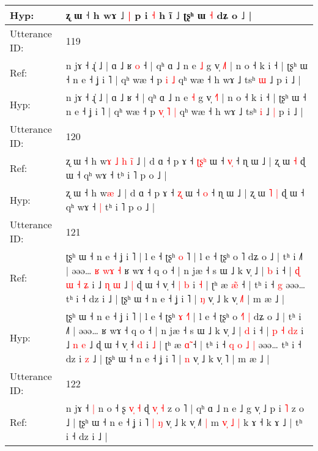 \documentclass[10pt]{article}
\DeclareRobustCommand{\hl}[1]{{\textcolor{red}{#1}}}
\begin{document}
\begin{longtable}{ll}
 \\
Hyp: & ʐ ɯ ˧ h wɤ ˩\hl{ }\hl{|} p i \hl{˧} h ĩ ˩ ʈʂʰ ɯ \hl{˧} dʑ o ˩ |
 \\
\midrule
Utterance ID: & 119 \\
Ref: & n jɤ ˧ ɻ̍ ˩ | ɑ ˩ ʁ\hl{ }\hl{o} ˧ | qʰ ɑ ˩ n e \hl{˩} g v̩ \hl{˩}˥ | n o ˧ k i ˧ | ʈʂʰ ɯ ˧ n e ˧ ʝ i ˥ | qʰ wæ ˧ p\hl{}\hl{}\hl{} \hl{i} \hl{˩} qʰ wæ ˧ h wɤ ˩ tsʰ \hl{ɯ} ˩\hl{}\hl{} p i ˩ |
 \\
Hyp: & n jɤ ˧ ɻ̍ ˩ | ɑ ˩ ʁ\hl{}\hl{} ˧ | qʰ ɑ ˩ n e \hl{˧} g v̩ \hl{˧}˥ | n o ˧ k i ˧ | ʈʂʰ ɯ ˧ n e ˧ ʝ i ˥ | qʰ wæ ˧ p\hl{ }\hl{v}\hl{̩} \hl{˥} \hl{|} qʰ wæ ˧ h wɤ ˩ tsʰ \hl{i} ˩\hl{ }\hl{|} p i ˩ |
 \\
\midrule
Utterance ID: & 120 \\
Ref: & ʐ ɯ ˧ h w\hl{ɤ}\hl{ }\hl{˩}\hl{ }\hl{h}\hl{ }\hl{i}\hl{̃} ˩ | d ɑ ˧ p ɤ ˧ \hl{ʈ}\hl{ʂ}\hl{ʰ} ɯ ˧ \hl{v}\hl{̩} ˧ ɳ ɯ ˩ | ʐ ɯ\hl{}\hl{} \hl{˧} ɖ ɯ ˧ qʰ wɤ ˧\hl{}\hl{} tʰ i ˥ p o ˩ |
 \\
Hyp: & ʐ ɯ ˧ h w\hl{}\hl{}\hl{}\hl{}\hl{}\hl{}\hl{}\hl{æ} ˩ | d ɑ ˧ p ɤ ˧ \hl{}\hl{}\hl{ʐ} ɯ ˧ \hl{}\hl{o} ˧ ɳ ɯ ˩ | ʐ ɯ\hl{ }\hl{˥} \hl{|} ɖ ɯ ˧ qʰ wɤ ˧\hl{ }\hl{|} tʰ i ˥ p o ˩ |
 \\
\midrule
Utterance ID: & 121 \\
Ref: & ʈʂʰ ɯ ˧ n e ˧ ʝ i ˥ | l e ˧ ʈʂʰ \hl{o} \hl{}˥ | l e ˧ ʈʂʰ o \hl{}˥\hl{}\hl{} dʑ o ˩ | tʰ i ˩˥ | əəə…\hl{ }\hl{ʁ}\hl{ }\hl{w}\hl{ɤ}\hl{ }\hl{˧} ʁ wɤ ˧ q o ˧ | n jæ ˧ s ɯ ˩ k v̩ ˩ | \hl{b} i ˧ | \hl{ɖ} \hl{ɯ} \hl{˧}\hl{ }\hl{ʑ} i ˩ \hl{ɳ} \hl{ɯ} ˩\hl{ }\hl{|} ɖ ɯ ˧ v̩ ˧\hl{ }\hl{|} \hl{b} i \hl{˧} | ʈʰ æ \hl{æ}̃ ˧ | tʰ i ˧\hl{}\hl{}\hl{}\hl{}\hl{}\hl{} \hl{g} əəə… tʰ i ˧ dz i\hl{}\hl{} ˩ | ʈʂʰ ɯ ˧ n e ˧ ʝ i ˥ | \hl{ŋ} v̩ ˩ k v̩ \hl{˩}˥ | m æ ˩ |
 \\
Hyp: & ʈʂʰ ɯ ˧ n e ˧ ʝ i ˥ | l e ˧ ʈʂʰ \hl{ɤ} \hl{˧}˥ | l e ˧ ʈʂʰ o \hl{˧}˥\hl{ }\hl{|} dʑ o ˩ | tʰ i ˩˥ | əəə…\hl{}\hl{}\hl{}\hl{}\hl{}\hl{}\hl{} ʁ wɤ ˧ q o ˧ | n jæ ˧ s ɯ ˩ k v̩ ˩ | \hl{d} i ˧ | \hl{p} \hl{˧} \hl{}\hl{d}\hl{z} i ˩ \hl{n} \hl{e} ˩\hl{}\hl{} ɖ ɯ ˧ v̩ ˧\hl{}\hl{} \hl{d} i \hl{˩} | ʈʰ æ \hl{ɑ}̃ ˧ | tʰ i ˧\hl{ }\hl{q}\hl{ }\hl{o}\hl{ }\hl{˩} \hl{|} əəə… tʰ i ˧ dz i\hl{ }\hl{z} ˩ | ʈʂʰ ɯ ˧ n e ˧ ʝ i ˥ | \hl{n} v̩ ˩ k v̩ \hl{}˥ | m æ ˩ |
 \\
\midrule
Utterance ID: & 122 \\
Ref: & n jɤ ˧\hl{ }\hl{|} n o ˧ ʂ \hl{}\hl{v}\hl{̩} \hl{˧} ɖ \hl{v}\hl{̩} \hl{˧} z o ˥ | qʰ ɑ ˩ n e ˩ g v̩ ˩\hl{}\hl{} p i \hl{˥} z o ˩ | ʈʂʰ ɯ ˧ n e ˧ ʝ i ˥\hl{ }\hl{|} \hl{ŋ} v̩ ˩ k v̩ ˩\hl{˥}\hl{ }\hl{|} m\hl{ }\hl{v}\hl{̩} \hl{˩} \hl{|} k ɤ ˧ k ɤ ˩ | tʰ i ˧ dz i ˩ |

\end{longtable}
\end{document}
